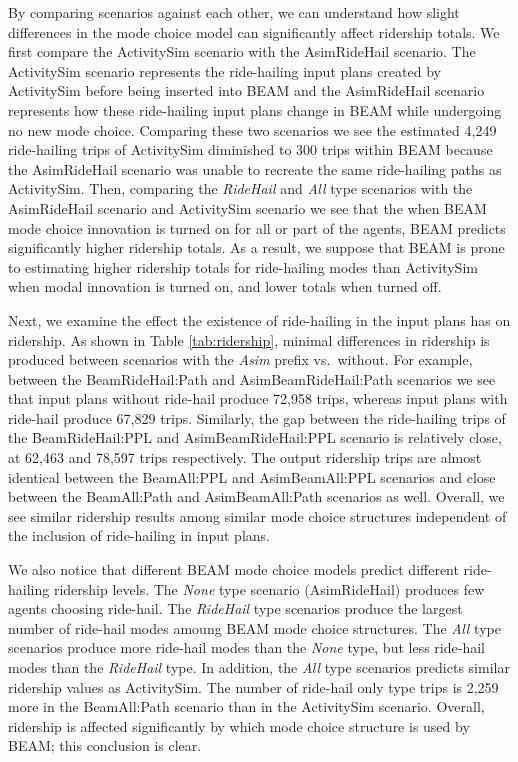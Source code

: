 \documentclass[fancy, masters]{byuthesis}
\begin{document}
By comparing scenarios against each other, we can understand how slight differences in the mode choice model can significantly affect ridership totals. We first compare the ActivitySim scenario with the AsimRideHail scenario. The ActivitySim scenario represents the ride-hailing input plans created by ActivitySim before being inserted into BEAM and the AsimRideHail scenario represents how these ride-hailing input plans change in BEAM while undergoing no new mode choice. Comparing these two scenarios we see the estimated 4,249 ride-hailing trips of ActivitySim diminished to 300 trips within BEAM because the AsimRideHail scenario was unable to recreate the same ride-hailing paths as ActivitySim. Then, comparing the \emph{RideHail} and \emph{All} type scenarios with the AsimRideHail scenario and ActivitySim scenario we see that the when BEAM mode choice innovation is turned on for all or part of the agents, BEAM predicts significantly higher ridership totals. As a result, we suppose that BEAM is prone to estimating higher ridership totals for ride-hailing modes than ActivitySim when modal innovation is turned on, and lower totals when turned off.

Next, we examine the effect the existence of ride-hailing in the input plans has on ridership. As shown in Table \ref{tab:ridership}, minimal differences in ridership is produced between scenarios with the \emph{Asim} prefix vs.~without. For example, between the BeamRideHail:Path and AsimBeamRideHail:Path scenarios we see that input plans without ride-hail produce 72,958 trips, whereas input plans with ride-hail produce 67,829 trips. Similarly, the gap between the ride-hailing trips of the BeamRideHail:PPL and AsimBeamRideHail:PPL scenario is relatively close, at 62,463 and 78,597 trips respectively. The output ridership trips are almost identical between the BeamAll:PPL and AsimBeamAll:PPL scenarios and close between the BeamAll:Path and AsimBeamAll:Path scenarios as well. Overall, we see similar ridership results among similar mode choice structures independent of the inclusion of ride-hailing in input plans.

We also notice that different BEAM mode choice models predict different ride-hailing ridership levels. The \emph{None} type scenario (AsimRideHail) produces few agents choosing ride-hail. The \emph{RideHail} type scenarios produce the largest number of ride-hail modes amoung BEAM mode choice structures. The \emph{All} type scenarios produce more ride-hail modes than the \emph{None} type, but less ride-hail modes than the \emph{RideHail} type. In addition, the \emph{All} type scenarios predicts similar ridership values as ActivitySim. The number of ride-hail only type trips is 2,259 more in the BeamAll:Path scenario than in the ActivitySim scenario. Overall, ridership is affected significantly by which mode choice structure is used by BEAM; this conclusion is clear.
\end{document}
